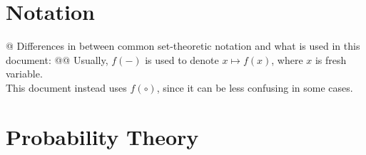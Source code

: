 \documentclass[]{article}
\begin{document}

\section{Notation}

\begin{easylist}[itemize]
@ {%
  Differences in between common set-theoretic notation and what is used in
  this document:
}
@@ {%
  Usually, $f({-})$ is used to denote $x \mapsto f(x)$, where $x$ is fresh
  variable. \\ This document instead uses $f(\circ)$, since it can be less
  confusing in some cases.
}
\end{easylist}


\section{Probability Theory}
\end{document}
